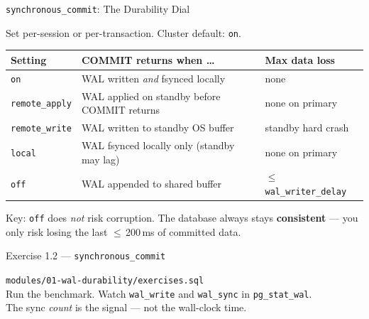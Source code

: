 \documentclass[aspectratio=169,10pt]{beamer}
\begin{document}
\begin{frame}{\texttt{synchronous\_commit}: The Durability Dial}

  {\small Set per-session or per-transaction. Cluster default: \texttt{on}.}

  \vspace{0.4em}
  \begin{tabularx}{\textwidth}{l X l}
    \toprule
    \textbf{Setting} & \textbf{COMMIT returns when \ldots} & \textbf{Max data loss} \\
    \midrule
    \texttt{on}             & WAL written \textit{and} fsynced locally          & none \\[3pt]
    \texttt{remote\_apply} & WAL applied on standby before COMMIT returns      & none on primary \\[3pt]
    \texttt{remote\_write} & WAL written to standby OS buffer                  & standby hard crash \\[3pt]
    \texttt{local}         & WAL fsynced locally only (standby may lag)        & none on primary \\[3pt]
    \texttt{off}           & WAL appended to shared buffer                     & $\leq$ \texttt{wal\_writer\_delay} \\
    \bottomrule
  \end{tabularx}

  \vspace{0.5em}
  \alert{Key:} \texttt{off} does \textit{not} risk corruption.
  The database always stays \textbf{consistent} --- you only risk losing
  the last $\leq$\,200\,ms of committed data.
\end{frame}

\begin{frame}{Exercise 1.2 --- \texttt{synchronous\_commit}}

  \begin{block}{}
    \faTerminal\enspace\texttt{modules/01-wal-durability/exercises.sql}\\[0.5em]
    Run the benchmark.  Watch \texttt{wal\_write} and \texttt{wal\_sync}
    in \texttt{pg\_stat\_wal}.\\[0.3em]
    The sync \textit{count} is the signal --- not the wall-clock time.
  \end{block}

\end{frame}
\end{document}
